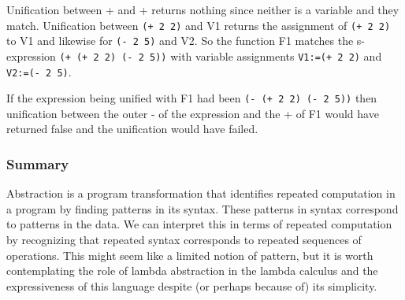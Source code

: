 \documentclass[a4paper,10pt]{article}
\begin{document}
Unification between + and + returns nothing since neither is a variable and they match.  Unification between \texttt{(+ 2 2)} and V1 returns the assignment of \texttt{(+ 2 2)} to V1 and likewise for \texttt{(- 2 5)} and V2.  So the function F1 matches the s-expression \texttt{(+ (+ 2 2) (- 2 5))} with variable assignments \texttt{V1:=(+ 2 2)} and \texttt{V2:=(- 2 5)}.

If the expression being unified with F1 had been \texttt{(- (+ 2 2) (- 2 5))} then unification between the outer - of the expression and the + of F1 would have returned false and the unification would have failed.

\subsubsection{Summary}
Abstraction is a program transformation that identifies repeated computation in a program by finding patterns in its syntax.  These patterns in syntax correspond to patterns in the data.  We can interpret this in terms of repeated computation by recognizing that repeated syntax corresponds to repeated sequences of operations.  This might seem like a limited notion of pattern, but it is worth contemplating the role of lambda abstraction in the lambda calculus and the expressiveness of this language despite (or perhaps because of) its simplicity.
\end{document}
